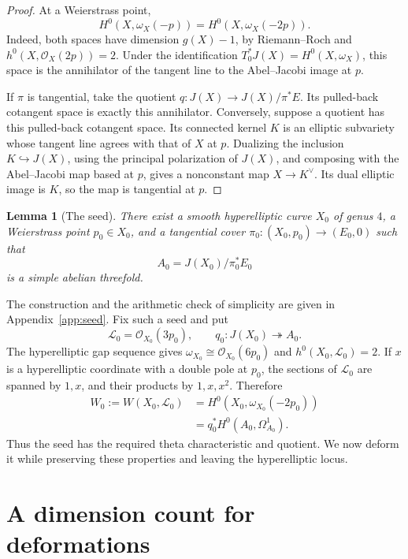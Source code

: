 \documentclass[11pt]{amsart}
\newtheorem{lemma}{Lemma}[section]
\theoremstyle{remark}
\newcommand{\LL}{\mathcal L}
\numberwithin{equation}{section}
\begin{document}
\begin{proof}
At a Weierstrass point,
\[
H^0(X,\omega_X(-p))=H^0(X,\omega_X(-2p)).
\]
Indeed, both spaces have dimension $g(X)-1$, by Riemann--Roch and
$h^0(X,\mathcal O_X(2p))=2$. Under the identification
$T_0^*J(X)=H^0(X,\omega_X)$, this space is the annihilator of the tangent
line to the Abel--Jacobi image at $p$.

If $\pi$ is tangential, take the quotient
$q:J(X)\to J(X)/\pi^*E$. Its pulled-back cotangent space is exactly this
annihilator. Conversely, suppose a quotient has this pulled-back
cotangent space. Its connected kernel $K$ is an elliptic subvariety
whose tangent line agrees with that of $X$ at $p$. Dualizing the
inclusion $K\hookrightarrow J(X)$, using the principal polarization of
$J(X)$, and composing with the Abel--Jacobi map based at $p$, gives a
nonconstant map $X\to K^\vee$. Its dual elliptic image is $K$, so the
map is tangential at $p$.
\end{proof}

\begin{lemma}[The seed]\label{lem:seed}
There exist a smooth hyperelliptic curve $X_0$ of genus $4$, a
Weierstrass point $p_0\in X_0$, and a tangential cover
$\pi_0:(X_0,p_0)\to(E_0,0)$ such that
\[
A_0=J(X_0)/\pi_0^*E_0
\]
is a simple abelian threefold.
\end{lemma}

The construction and the arithmetic check of simplicity are given in
Appendix~\ref{app:seed}. Fix such a seed and put
\[
\LL_0=\mathcal O_{X_0}(3p_0),\qquad
q_0:J(X_0)\twoheadrightarrow A_0.
\]
The hyperelliptic gap sequence gives
$\omega_{X_0}\cong\mathcal O_{X_0}(6p_0)$ and $h^0(X_0,\LL_0)=2$.
If $x$ is a hyperelliptic coordinate with a double pole at $p_0$, the
sections of $\LL_0$ are spanned by $1,x$, and their products by
$1,x,x^2$. Therefore
\begin{equation}\label{eq:seed-W}
\begin{split}
W_0:=W(X_0,\LL_0)
&=H^0(X_0,\omega_{X_0}(-2p_0))\\
&=q_0^*H^0(A_0,\Omega_{A_0}^1).
\end{split}
\end{equation}
Thus the seed has the required theta characteristic and quotient.
We now deform it while preserving these properties and leaving the
hyperelliptic locus.

\section{A dimension count for deformations}\label{sec:deformation}
\end{document}
